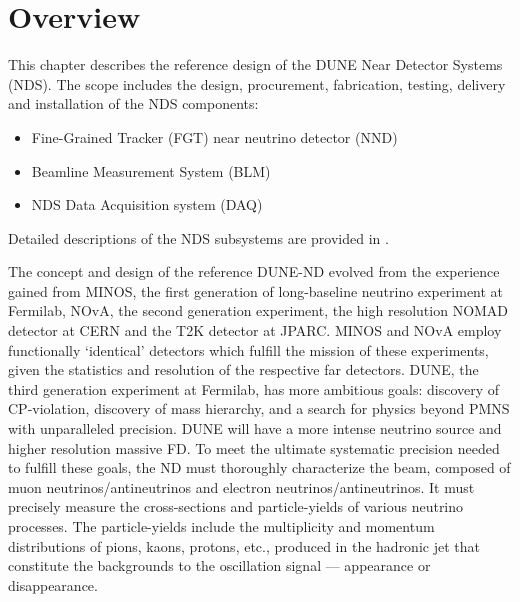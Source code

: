 \section{Overview} %
\label{sec:detectors-nd-ref-ov}

This chapter describes the reference design of the DUNE Near Detector
Systems (NDS). The scope includes the design, procurement,
fabrication, testing, delivery and installation of the NDS components:
\begin{itemize}
\item Fine-Grained Tracker (FGT) near neutrino detector (NND)
\item Beamline Measurement System (BLM)
\item NDS Data Acquisition system (DAQ)  
\end{itemize}
Detailed descriptions of the NDS subsystems are provided in \anxndref. 


The concept and design of the reference DUNE-ND evolved from the
experience gained from MINOS, the first generation of long-baseline
neutrino experiment at Fermilab, NOvA, the second generation
experiment, the high resolution NOMAD detector at CERN and the T2K
detector at JPARC. MINOS and NOvA employ functionally `identical'
detectors which fulfill the mission of these experiments, given the
statistics and resolution of the respective far detectors.  DUNE, the
third generation experiment at Fermilab, has more ambitious goals:
discovery of CP-violation, discovery of mass hierarchy, and a search
for physics beyond PMNS with unparalleled precision. DUNE will have a
more intense neutrino source and higher resolution massive FD.  To
meet the ultimate systematic precision needed to fulfill these goals,
the ND must thoroughly characterize the beam, composed of muon
neutrinos/antineutrinos and electron neutrinos/antineutrinos. It must
precisely measure the cross-sections and particle-yields of various
neutrino processes.  The particle-yields include the multiplicity and
momentum distributions of pions, kaons, protons, etc., produced in the
hadronic jet that constitute the backgrounds to the oscillation signal
--- appearance or disappearance.

